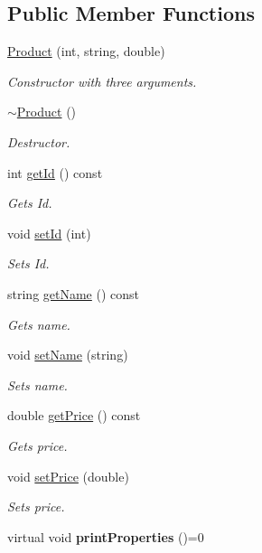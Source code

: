 \subsection*{Public Member Functions}
\begin{DoxyCompactItemize}
\item 
\hyperlink{classProduct_aa7705364efa0a211575a00b5a6b8537c}{Product} (int, string, double)
\begin{DoxyCompactList}\small\item\em Constructor with three arguments. \end{DoxyCompactList}\item 
\mbox{\label{classProduct_abe0afd3bea96d979185ec2cfdf681e6f}} 
\hyperlink{classProduct_abe0afd3bea96d979185ec2cfdf681e6f}{$\sim$\+Product} ()
\begin{DoxyCompactList}\small\item\em Destructor. \end{DoxyCompactList}\item 
int \hyperlink{classProduct_a6cca56300caa309ce1f256a75b7afb32}{get\+Id} () const
\begin{DoxyCompactList}\small\item\em Gets Id. \end{DoxyCompactList}\item 
void \hyperlink{classProduct_afeb389b5d13ac1e68bbdafe41c898689}{set\+Id} (int)
\begin{DoxyCompactList}\small\item\em Sets Id. \end{DoxyCompactList}\item 
string \hyperlink{classProduct_add69128805228e23dcc6619b0a167a08}{get\+Name} () const
\begin{DoxyCompactList}\small\item\em Gets name. \end{DoxyCompactList}\item 
void \hyperlink{classProduct_ae5aa54c86d99f87b2b6bca4aa1a0479f}{set\+Name} (string)
\begin{DoxyCompactList}\small\item\em Sets name. \end{DoxyCompactList}\item 
double \hyperlink{classProduct_a3be25f647260d61df6063ef706261c7f}{get\+Price} () const
\begin{DoxyCompactList}\small\item\em Gets price. \end{DoxyCompactList}\item 
void \hyperlink{classProduct_aacd8e249939d497c95881ae859280d48}{set\+Price} (double)
\begin{DoxyCompactList}\small\item\em Sets price. \end{DoxyCompactList}\item 
\mbox{\label{classProduct_a2258435eb75f901b13f44f83da4927d8}} 
virtual void {\bfseries print\+Properties} ()=0
\end{DoxyCompactItemize}


